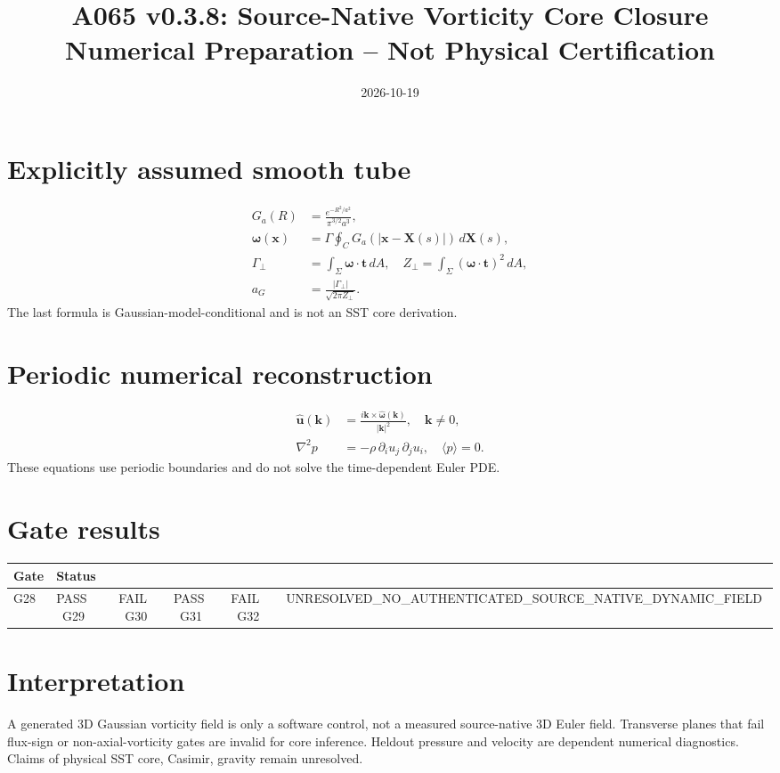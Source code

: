 \documentclass[11pt,a4paper]{article}
\title{A065 v0.3.8: Source-Native Vorticity Core Closure\\\large Numerical Preparation -- Not Physical Certification}
\date{2026-10-19}
\begin{document}
\maketitle
\section*{Explicitly assumed smooth tube}
\begin{align}
G_a(R)&=\frac{e^{-R^2/a^2}}{\pi^{3/2}a^3},\\
\boldsymbol\omega(\mathbf x)&=\Gamma\oint_C G_a(|\mathbf x-\mathbf X(s)|)\,d\mathbf X(s),\\
\Gamma_\perp&=\int_\Sigma \boldsymbol\omega\cdot\mathbf t\,dA,\quad
Z_\perp=\int_\Sigma (\boldsymbol\omega\cdot\mathbf t)^2\,dA,\\
a_G&=\frac{|\Gamma_\perp|}{\sqrt{2\pi Z_\perp}}.
\end{align}
The last formula is Gaussian-model-conditional and is not an SST core derivation.
\section*{Periodic numerical reconstruction}
\begin{align}
\hat{\mathbf u}(\mathbf k)&=\frac{i\mathbf k\times\hat{\boldsymbol\omega}(\mathbf k)}{|\mathbf k|^2},\quad \mathbf k\neq0,\\
\nabla^2p&=-\rho\,\partial_i u_j\,\partial_j u_i,\quad \langle p\rangle=0.
\end{align}
These equations use periodic boundaries and do not solve the time-dependent Euler PDE.
\section*{Gate results}
\begin{tabular}{ll}\toprule Gate & Status \\\midrule
G28 & PASS \
G29 & FAIL \
G30 & PASS \
G31 & FAIL \
G32 & UNRESOLVED\_NO\_AUTHENTICATED\_SOURCE\_NATIVE\_DYNAMIC\_FIELD \
\bottomrule
\end{tabular}
\section*{Interpretation}
A generated 3D Gaussian vorticity field is only a software control, not a measured source-native 3D Euler field. Transverse planes that fail flux-sign or non-axial-vorticity gates are invalid for core inference. Heldout pressure and velocity are dependent numerical diagnostics. Claims of physical SST core, Casimir, gravity remain unresolved.
\end{document}
